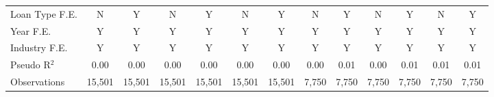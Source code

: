 {\begin{tabular}{l*{12}{c}}
Loan Type F.E.      &           N         &           Y         &           N         &           Y         &           N         &           Y         &           N         &           Y         &           N         &           Y         &           N         &           Y         \\
Year F.E.           &           Y         &           Y         &           Y         &           Y         &           Y         &           Y         &           Y         &           Y         &           Y         &           Y         &           Y         &           Y         \\
Industry F.E.       &           Y         &           Y         &           Y         &           Y         &           Y         &           Y         &           Y         &           Y         &           Y         &           Y         &           Y         &           Y         \\

Pseudo R$ ^2$       &        0.00         &        0.00         &        0.00         &        0.00         &        0.00         &        0.00         &        0.00         &        0.01         &        0.00         &        0.01         &        0.01         &        0.01         \\
Observations        &      15,501         &      15,501         &      15,501         &      15,501         &      15,501         &      15,501         &       7,750         &       7,750         &       7,750         &       7,750         &       7,750         &       7,750         \\
\bottomrule
\end{tabular}
}

